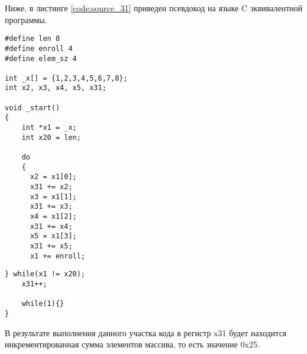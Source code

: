 Ниже, в листинге \ref{code:source_31} приведен псевдокод на языке C эквивалентной программы.

\begin{lstlisting}[label=code:source_31, caption=Псевдокод на языке C эквивалентной программы]
#define len 8
#define enroll 4
#define elem_sz 4

int _x[] = {1,2,3,4,5,6,7,8};
int x2, x3, x4, x5, x31;

void _start()
{
	int *x1 = _x;
    int x20 = len;

    do
    {
      x2 = x1[0];
      x31 += x2;
      x3 = x1[1];
      x31 += x3;
      x4 = x1[2];
      x31 += x4;
      x5 = x1[3];
      x31 += x5;
      x1 += enroll;
\end{lstlisting}
\begin{lstlisting}[label=code:source_32, caption=Продолжение листинга \ref{code:source_31}]
    } while(x1 != x20);
    x31++;

    while(1){}
}
\end{lstlisting}

В результате выполнения данного участка кода в регистр x31 будет находится инкрементированная  сумма элементов массива, то есть значение 0x25.
